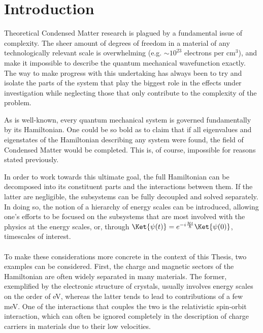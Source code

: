 \chapter{Introduction}
Theoretical Condensed Matter research is plagued by a fundamental issue of complexity. The sheer amount of degrees of freedom in a material of any technologically relevant scale is overwhelming (e.g. $\sim10^{23}$ electrons per cm$^3$), and make it impossible to describe the quantum mechanical wavefunction exactly.
The way to make progress with this undertaking has always been to try and isolate the parts of the system that play the biggest role in the effects under investigation while neglecting those that only contribute to the complexity of the problem.

As is well-known, every quantum mechanical system is governed fundamentally by its Hamiltonian.
One could be so bold as to claim that if all eigenvalues and eigenstates of the Hamiltonian describing any system were found, the field of Condensed Matter would be completed. This is, of course, impossible for reasons stated previously.

In order to work towards this ultimate goal, the full Hamiltonian can be decomposed into its constituent parts and the interactions between them.
If the latter are negligible, the subsystems can be fully decoupled and solved separately. In doing so, the notion of a hierarchy of energy scales can be introduced, allowing one's efforts to be focused on the subsystems that are most involved with the physics at the energy scales, or, through $\Ket{\psi(t)} = e^{-i \frac{\mathcal{H}t}{\hbar}}\Ket{\psi(0)}$, timescales of interest.
\\\\
To make these considerations more concrete in the context of this Thesis, two examples can be considered.
First, the charge and magnetic sectors of the Hamiltonian are often widely separated in many materials.
The former, exemplified by the electronic structure of crystals, usually involves energy scales on the order of eV, whereas the latter tends to lead to contributions of a few meV.
One of the interactions that couples the two is the relativistic spin-orbit interaction, which can often be ignored completely in the description of charge carriers in materials due to their low velocities.

